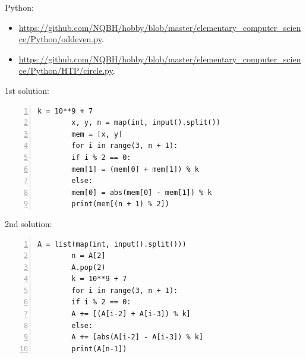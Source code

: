 \documentclass{article}
\begin{document}
Python:
\begin{itemize}
	\item \url{https://github.com/NQBH/hobby/blob/master/elementary_computer_science/Python/oddeven.py}.
	\item \url{https://github.com/NQBH/hobby/blob/master/elementary_computer_science/Python/HTP/circle.py}.
\end{itemize}

\begin{multicols}{2}
	1st solution:
	\begin{Verbatim}[numbers=left,xleftmargin=5mm]
		k = 10**9 + 7
		x, y, n = map(int, input().split())
		mem = [x, y]
		for i in range(3, n + 1):
		if i % 2 == 0:
		mem[1] = (mem[0] + mem[1]) % k
		else:
		mem[0] = abs(mem[0] - mem[1]) % k
		print(mem[(n + 1) % 2])
	\end{Verbatim}
	\columnbreak
	2nd solution:
	\begin{Verbatim}[numbers=left,xleftmargin=5mm]
		A = list(map(int, input().split()))
		n = A[2]
		A.pop(2)
		k = 10**9 + 7
		for i in range(3, n + 1):
		if i % 2 == 0:
		A += [(A[i-2] + A[i-3]) % k]
		else:
		A += [abs(A[i-2] - A[i-3]) % k]
		print(A[n-1])
	\end{Verbatim}
\end{multicols}
\end{document}
